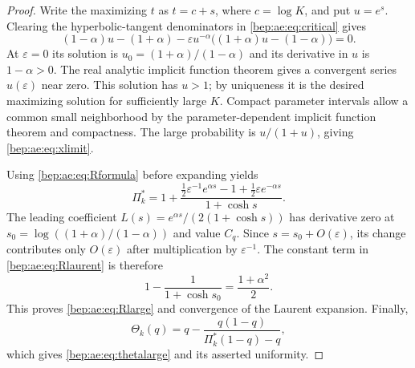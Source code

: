 \documentclass[11pt]{article}
\numberwithin{equation}{section}
\theoremstyle{definition}
\theoremstyle{remark}
\begin{document}
\begin{proof}
Write the maximizing $t$ as $t=c+s$, where $c=\log K$, and put $u=e^s$.
Clearing the hyperbolic-tangent denominators in \eqref{bep:ae:eq:critical} gives
\begin{equation}\label{bep:ae:eq:IFTlarge}
 (1-\alpha)u-(1+\alpha)
 -\varepsilon u^{-\alpha}
       \bigl((1+\alpha)u-(1-\alpha)\bigr)=0.
\end{equation}
At $\varepsilon=0$ its solution is
$u_0=(1+\alpha)/(1-\alpha)$ and its derivative in $u$ is
$1-\alpha>0$. The real analytic implicit function theorem gives a
convergent series $u(\varepsilon)$ near zero. This solution has $u>1$;
by uniqueness it is the desired maximizing solution for sufficiently
large $K$. Compact parameter intervals allow a common small neighborhood
by the parameter-dependent implicit function theorem and compactness.
The large probability is $u/(1+u)$, giving \eqref{bep:ae:eq:xlimit}.

Using \eqref{bep:ae:eq:Rformula} before expanding yields
\begin{equation}\label{bep:ae:eq:Rlaurent}
 \Pi^{*}_k=1+
 \frac{\tfrac12\varepsilon^{-1}e^{\alpha s}-1
                    +\tfrac12\varepsilon e^{-\alpha s}}
      {1+\cosh s}.
\end{equation}
The leading coefficient
$L(s)=e^{\alpha s}/(2(1+\cosh s))$ has derivative zero at
$s_0=\log((1+\alpha)/(1-\alpha))$ and value $C_q$.
Since $s=s_0+O(\varepsilon)$, its change contributes only
$O(\varepsilon)$ after multiplication by $\varepsilon^{-1}$.
The constant term in \eqref{bep:ae:eq:Rlaurent} is therefore
\[
 1-\frac1{1+\cosh s_0}=\frac{1+\alpha^2}{2}.
\]
This proves \eqref{bep:ae:eq:Rlarge} and convergence of the Laurent expansion.
Finally,
\[
 \Theta_k(q)=q-\frac{q(1-q)}{\Pi^{*}_k(1-q)-q},
\]
which gives \eqref{bep:ae:eq:thetalarge} and its asserted uniformity.
\end{proof}
\end{document}

